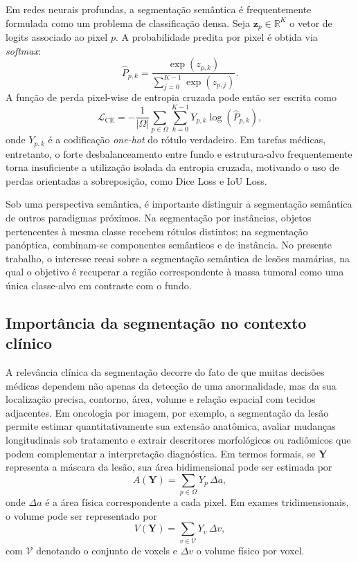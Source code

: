 \documentclass[tcc,capa]{texufpel}
\begin{document}
Em redes neurais profundas, a segmentação semântica é frequentemente formulada como um problema de classificação densa. Seja \(\mathbf{z}_{p} \in \mathbb{R}^{K}\) o vetor de logits associado ao pixel \(p\). A probabilidade predita por pixel é obtida via \textit{softmax}:
\begin{equation}
	\hat{P}_{p,k} = \frac{\exp(z_{p,k})}{\sum_{j=0}^{K-1}\exp(z_{p,j})}.
\end{equation}
A função de perda pixel-wise de entropia cruzada pode então ser escrita como
\begin{equation}
	\mathcal{L}_{\text{CE}}
	=
	-\frac{1}{|\Omega|}
	\sum_{p \in \Omega}
	\sum_{k=0}^{K-1}
	Y_{p,k}\log(\hat{P}_{p,k}),
\end{equation}
onde \(Y_{p,k}\) é a codificação \textit{one-hot} do rótulo verdadeiro. Em tarefas médicas, entretanto, o forte desbalanceamento entre fundo e estrutura-alvo frequentemente torna insuficiente a utilização isolada da entropia cruzada, motivando o uso de perdas orientadas a sobreposição, como Dice Loss e IoU Loss.

Sob uma perspectiva semântica, é importante distinguir a segmentação semântica de outros paradigmas próximos. Na segmentação por instâncias, objetos pertencentes à mesma classe recebem rótulos distintos; na segmentação panóptica, combinam-se componentes semânticos e de instância. No presente trabalho, o interesse recai sobre a segmentação semântica de lesões mamárias, na qual o objetivo é recuperar a região correspondente à massa tumoral como uma única classe-alvo em contraste com o fundo.

\subsection{Importância da segmentação no contexto clínico}

A relevância clínica da segmentação decorre do fato de que muitas decisões médicas dependem não apenas da detecção de uma anormalidade, mas da sua localização precisa, contorno, área, volume e relação espacial com tecidos adjacentes. Em oncologia por imagem, por exemplo, a segmentação da lesão permite estimar quantitativamente sua extensão anatômica, avaliar mudanças longitudinais sob tratamento e extrair descritores morfológicos ou radiômicos que podem complementar a interpretação diagnóstica. Em termos formais, se \(\mathbf{Y}\) representa a máscara da lesão, sua área bidimensional pode ser estimada por
\begin{equation}
	A(\mathbf{Y}) = \sum_{p \in \Omega} Y_p \, \Delta a,
\end{equation}
onde \(\Delta a\) é a área física correspondente a cada pixel. Em exames tridimensionais, o volume pode ser representado por
\begin{equation}
	V(\mathbf{Y}) = \sum_{v \in \mathcal{V}} Y_v \, \Delta v,
\end{equation}
com \(\mathcal{V}\) denotando o conjunto de voxels e \(\Delta v\) o volume físico por voxel.
\end{document}
